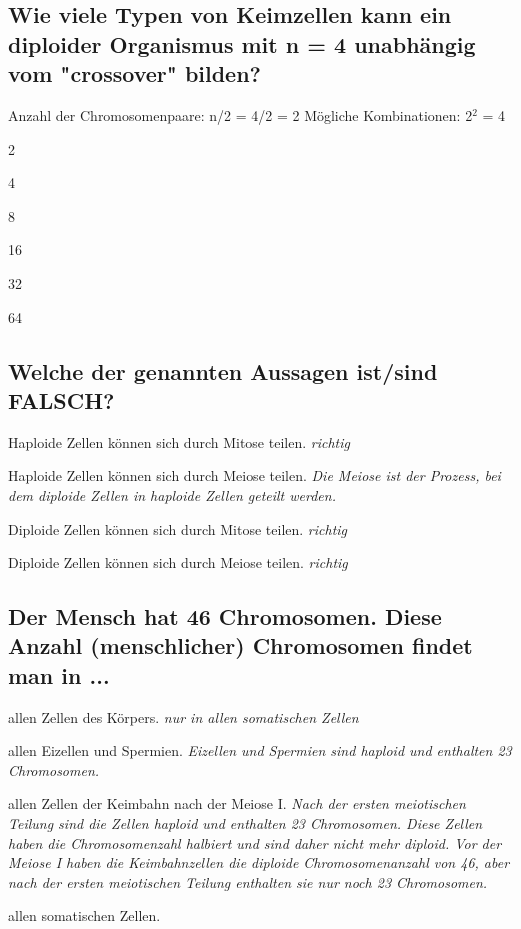 \documentclass{article}
\newcommand{\cmark}{\ding{51}}%
\newcommand{\done}{\rlap{$\square$}{\raisebox{2pt}{\large\hspace{1pt}\cmark}}%
\hspace{-2.5pt}}
\begin{document}
\subsection*{Wie viele Typen von Keimzellen kann ein diploider Organismus mit n = 4
unabhängig vom "crossover" bilden?}
Anzahl der Chromosomenpaare: n/2 = 4/2 = 2 \newline
Mögliche Kombinationen: 2$^2$ = 4
\begin{todolist} %
\item 2
\item [\done] 4
\item 8
\item 16
\item 32
\item 64
\end{todolist}
\subsection*{Welche der genannten Aussagen ist/sind FALSCH?}
\begin{todolist} %
\item Haploide Zellen können sich durch Mitose teilen. \textit{\scriptsize richtig}
\item [\done] Haploide Zellen können sich durch Meiose teilen. \textit{\scriptsize Die Meiose ist der Prozess, bei dem diploide Zellen in haploide Zellen geteilt werden.}
\item Diploide Zellen können sich durch Mitose teilen. \textit{\scriptsize richtig}
\item Diploide Zellen können sich durch Meiose teilen. \textit{\scriptsize richtig}
\end{todolist}
\subsection*{Der Mensch hat 46 Chromosomen. Diese Anzahl (menschlicher)
Chromosomen findet man in ...}
\begin{todolist} %
\item allen Zellen des Körpers. \textit{\scriptsize nur in allen somatischen Zellen}
\item allen Eizellen und Spermien. \textit{\scriptsize Eizellen und Spermien sind haploid und enthalten 23 Chromosomen.}
\item allen Zellen der Keimbahn nach der Meiose I. \textit{\scriptsize Nach der ersten meiotischen Teilung sind die Zellen haploid und enthalten 23 Chromosomen. Diese Zellen haben die Chromosomenzahl halbiert und sind daher nicht mehr diploid. Vor der Meiose I haben die Keimbahnzellen die diploide Chromosomenanzahl von 46, aber nach der ersten meiotischen Teilung enthalten sie nur noch 23 Chromosomen.}
\item [\done] allen somatischen Zellen.
\end{todolist}
\end{document}
